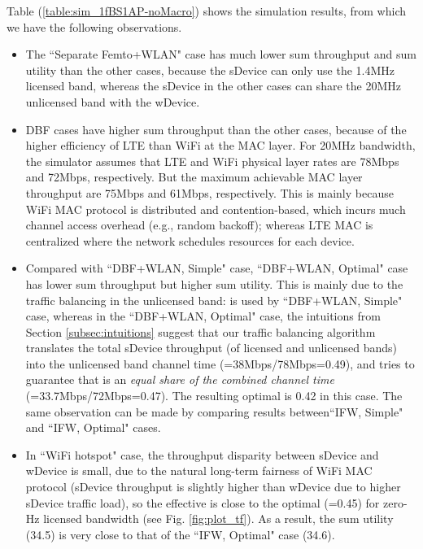 \documentclass[journal,final,letterpaper,10pt,doublecolumn,twoside]{IEEEtran}
\begin{document}
Table (\ref{table:sim_1fBS1AP-noMacro}) shows the simulation results, from which we have the following observations.
\begin{itemize}
  \item The ``Separate Femto+WLAN" case has much lower sum throughput and sum utility than the other cases, because the sDevice can only use the 1.4MHz licensed band, whereas the sDevice in the other cases can share the 20MHz unlicensed band with the wDevice.
  \item DBF cases have higher sum throughput than the other cases, because of the higher efficiency of LTE than WiFi at the MAC layer. For 20MHz bandwidth, the simulator assumes that LTE and WiFi physical layer rates are 78Mbps and 72Mbps, respectively. But the maximum achievable MAC layer throughput are 75Mbps and 61Mbps, respectively. This is mainly because WiFi MAC protocol is distributed and contention-based, which incurs much channel access overhead (e.g., random backoff); whereas LTE MAC is centralized where the network schedules resources for each device.
  \item Compared with ``DBF+WLAN, Simple" case, ``DBF+WLAN, Optimal" case has lower sum throughput but higher sum utility. This is mainly due to the traffic balancing in the unlicensed band:  is used by ``DBF+WLAN, Simple" case, whereas in the ``DBF+WLAN, Optimal" case, the intuitions from Section \ref{subsec:intuitions} suggest that our traffic balancing algorithm translates the total sDevice throughput (of licensed and unlicensed bands) into the unlicensed band channel time  (=38Mbps/78Mbps=0.49), and tries to guarantee  that  is an \emph{equal share of the combined channel time}  (=33.7Mbps/72Mbps=0.47). The resulting optimal  is 0.42 in this case.
       The same observation can be made by comparing results between``IFW, Simple" and ``IFW, Optimal" cases.
  \item In ``WiFi hotspot" case, the throughput disparity between sDevice and wDevice is small, due to the natural long-term fairness of WiFi MAC protocol (sDevice throughput is slightly higher than wDevice due to higher sDevice traffic load), so the effective  is close to the optimal  (=0.45) for zero-Hz licensed bandwidth  (see Fig. \ref{fig:plot_tf}). As a result, the sum utility (34.5) is very close to that of the ``IFW, Optimal" case (34.6).

\end{itemize}
\end{document}
